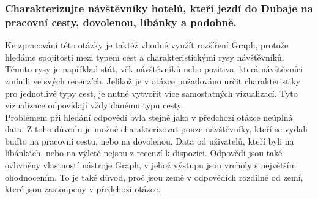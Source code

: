 \documentclass[czech,BP]{thesiskiv}
\begin{document}
\subsubsection{Charakterizujte návštěvníky hotelů, kteří jezdí do Dubaje na pracovní cesty, dovolenou, líbánky a podobně.}
\label{subsub:Charakteristika návštěvníků}
Ke zpracování této otázky je taktéž vhodné využít rozšíření Graph, protože hledáme spojitosti mezi typem cest a charakteristickými rysy návštěvníků. Těmito rysy je například stát, věk návštěvníků nebo pozitiva, která návštěvníci zmínili ve svých recenzích. Jelikož je v otázce požadováno určit charakteristiky pro jednotlivé typy cest, je nutné vytvořit více samostatných vizualizací. Tyto vizualizace odpovídají vždy danému typu cesty.
\\
Problémem při hledání odpovědí byla stejně jako v předchozí otázce neúplná data. Z toho důvodu je možné charakterizovat pouze návštěvníky, kteří se vydali buďto na pracovní cestu, nebo na dovolenou. Data od uživatelů, kteří byli na líbánkách, nebo na výletě nejsou z recenzí k dispozici. Odpovědi jsou také ovlivněny vlastností nástroje Graph, v jehož výstupu jsou vrcholy s největším ohodnocením. To je také důvod, proč jsou země v odpovědích rozdílné od zemí, které jsou zastoupeny v předchozí otázce.
\end{document}
